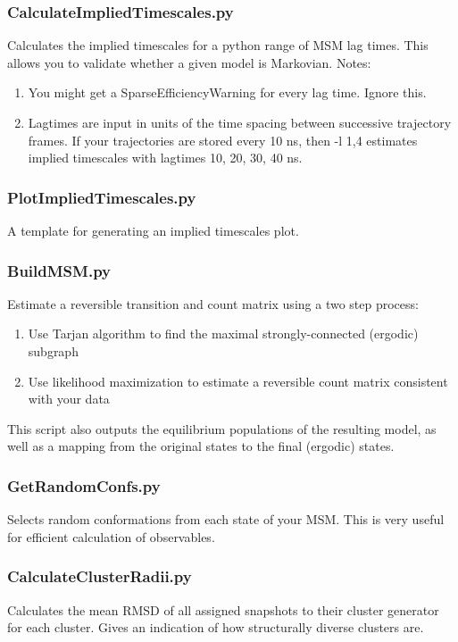 \documentclass[12pt]{article}
\begin{document}
\subsubsection{CalculateImpliedTimescales.py}
Calculates the implied timescales for a python range of MSM lag times.  This allows you to validate whether a given model is Markovian.  
	Notes:
\begin{enumerate}
 \item You might get a SparseEfficiencyWarning for every lag time. Ignore this.
 \item Lagtimes are input in units of the time spacing between successive trajectory frames.  If your trajectories are stored every 10 ns, then -l 1,4 estimates implied timescales with lagtimes 10, 20, 30, 40 ns.  
\end{enumerate}

\subsubsection{PlotImpliedTimescales.py}
A template for generating an implied timescales plot.

\subsubsection{BuildMSM.py}
Estimate a reversible transition and count matrix using a two step process:
\begin{enumerate}
 \item Use Tarjan algorithm to find the maximal strongly-connected (ergodic) subgraph
 \item Use likelihood maximization to estimate a reversible count matrix consistent with your data
\end{enumerate}

This script also outputs the equilibrium populations of the resulting model, as well as a mapping from the original states to the final (ergodic) states.

\subsubsection{GetRandomConfs.py}
Selects random conformations from each state of your MSM. This is very useful for efficient calculation of observables.

\subsubsection{CalculateClusterRadii.py}
Calculates the mean RMSD of all assigned snapshots to their cluster generator for each cluster. Gives an indication of how structurally diverse clusters are.
\end{document}
